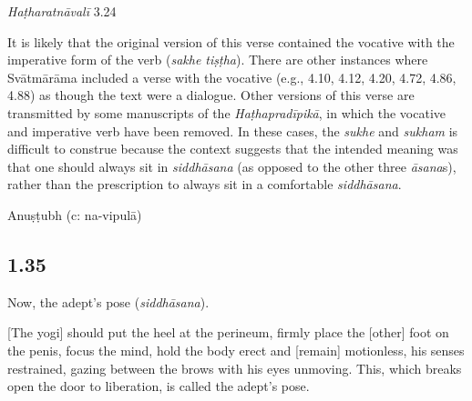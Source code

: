 \begin{ekdosis}
\begin{testimonia}[hp01_034]
\begin{versinnote}
\end{versinnote}

\emph{Haṭharatnāvalī} 3.24

\begin{versinnote}
\tl{\var{tathā ] satve P, sakhe T,t1}\\!}
\end{versinnote}

\end{testimonia}

\begin{philcomm}[hp01_034]
It is likely that the original version of this verse contained the vocative with the imperative form of the verb (\emph{sakhe tiṣṭha}). There are other instances where Svātmārāma included a verse with the vocative (e.g., 4.10, 4.12, 4.20, 4.72, 4.86, 4.88) as though the text were a dialogue. Other versions of this verse are transmitted by some manuscripts of the \emph{Haṭhapradīpikā}, in which the vocative and imperative verb have been removed. In these cases, the \emph{sukhe} and \emph{sukham} is difficult to construe because the context suggests that the intended meaning was that one should always sit in \emph{siddhāsana} (as opposed to the other three \emph{āsana}s), rather than the prescription to always sit in a comfortable \emph{siddhāsana}.   
\end{philcomm}

\begin{metre}[hp01_034]
Anuṣṭubh (c: na-vipulā)
\end{metre}

\subsection*{1.35}
\begin{translation}[hp01_035]
Now, the adept's pose (\emph{siddhāsana}).

[The yogi] should put the heel at the perineum, firmly place the [other] foot on the penis, focus the mind, hold the body erect and [remain] motionless, his senses restrained, gazing between the brows with his eyes unmoving. This, which breaks open the door to liberation, is called the adept’s pose.
\end{translation}


\end{ekdosis}
